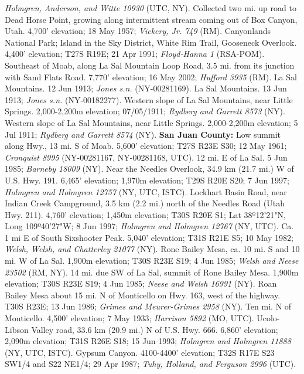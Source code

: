 \textit{Holmgren, Anderson, and Witte 10930} (UTC, NY).
Collected two mi. up road to Dead Horse Point, growing along intermittent stream
coming out of Box Canyon, Utah. 4,700' elevation; 18 May 1957;
\textit{Vickery, Jr. 749} (RM).
Canyonlands National Park; Island in the Sky District, White Rim Trail,
Gooseneck Overlook. 4,400' elevation; T27S R19E; 21 Apr 1991;
\textit{Floyd-Hanna 1} (RSA-POM).
Southeast of Moab, along La Sal Mountain Loop Road, 3.5 mi. from its junction
with Sand Flats Road. 7,770' elevation; 16 May 2002; \textit{Hufford 3935} (RM).
La Sal Mountains. 12 Jun 1913; \textit{Jones s.n.} (NY-00281169).
La Sal Mountains. 13 Jun 1913; \textit{Jones s.n.} (NY-00182277).
Western slope of La Sal Mountains, near Little Springs. 2,000-2,200m elevation;
07/05/1911; \textit{Rydberg and Garrett 8573} (NY).
Western slope of La Sal Mountains, near Little Springs. 2,000-2,200m elevation;
5 Jul 1911; \textit{Rydberg and Garrett 8574} (NY).
  \textbf{San Juan County:}
Low summit along Hwy., 13 mi. S of Moab.
5,600' elevation; T27S R23E S30; 12 May 1961;
\textit{Cronquist 8995} (NY-00281167, NY-00281168, UTC).
12 mi. E of La Sal. 5 Jun 1985; \textit{Barneby 18009} (NY).
Near the Needles Overlook, 34.9 km (21.7 mi.) W of U.S. Hwy. 191.
6,465' elevation; 1,970m elevation; T29S R20E S20; 7 Jun 1997;
\textit{Holmgren and Holmgren 12757} (NY, UTC, ISTC).
Lockhart Basin Road, near Indian Creek Campground, 3.5 km (2.2 mi.) north of
the Needles Road (Utah Hwy. 211). 4,760' elevation; 1,450m elevation;
T30S R20E S1; Lat 38º12'21"N, Long 109º40'27"W; 8 Jun 1997;
\textit{Holmgren and Holmgren 12767} (NY, UTC).
Ca. 1 mi E of South Sixshooter Peak. 5,040' elevation; T31S R21E S5;
10 May 1982; \textit{Welsh, Welsh, and Chatterley 21077} (NY).
Rone Bailey Mesa, ca. 10 mi. S and 10 mi. W of La Sal. 1,900m elevation;
T30S R23E S19; 4 Jun 1985; \textit{Welsh and Neese 23502} (RM, NY).
14 mi. due SW of La Sal, summit of Rone Bailey Mesa. 1,900m elevation;
T30S R23E S19; 4 Jun 1985; \textit{Neese and Welsh 16991} (NY).
Roan Bailey Mesa about 15 mi. N of Monticello on Hwy. 163, west of the highway.
T30S R23E; 13 Jun 1986; \textit{Grimes and Meurer-Grimes 2958} (NY).
Ten mi. N of Monticello. 4,500' elevation; 7 May 1933;
\textit{Harrison 5892} (MO, UTC).
Ucolo-Libson Valley road, 33.6 km (20.9 mi.) N of U.S. Hwy. 666.
6,860' elevation; 2,090m elevation; T31S R26E S18; 15 Jun 1993;
\textit{Holmgren and Holmgren 11888} (NY, UTC, ISTC).
Gypsum Canyon. 4100-4400' elevation; T32S R17E S23 SW1/4 and S22 NE1/4;
29 Apr 1987; \textit{Tuhy, Holland, and Ferguson 2996} (UTC).
